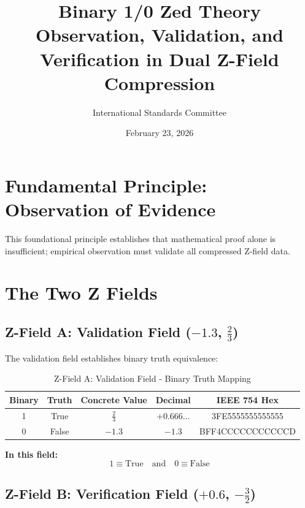 \documentclass[12pt]{article}
\title{Binary 1/0 Zed Theory\\Observation, Validation, and Verification in Dual Z-Field Compression}
\author{International Standards Committee}
\date{February 23, 2026}
\begin{document}
\maketitle

\section{Fundamental Principle: Observation of Evidence}

\begin{center}
\end{center}

This foundational principle establishes that mathematical proof alone is insufficient; empirical observation must validate all compressed Z-field data.

\section{The Two Z Fields}

\subsection{Z-Field A: Validation Field ($-1.3$, $\frac{2}{3}$)}

The validation field establishes binary truth equivalence:

\begin{table}[h]
\centering
\begin{tabular}{|c|c|c|c|c|}
\hline
\textbf{Binary} & \textbf{Truth} & \textbf{Concrete Value} & \textbf{Decimal} & \textbf{IEEE 754 Hex} \\
\hline
1 & True & $\frac{2}{3}$ & $+0.666\ldots$ & 3FE5555555555555 \\
\hline
0 & False & $-1.3$ & $-1.3$ & BFF4CCCCCCCCCCCD \\
\hline
\end{tabular}
\caption{Z-Field A: Validation Field - Binary Truth Mapping}
\end{table}

\textbf{In this field:}
\begin{equation}
\boxed{1 \equiv \text{True} \quad \text{and} \quad 0 \equiv \text{False}}
\end{equation}

\subsection{Z-Field B: Verification Field ($+0.6$, $-\frac{3}{2}$)}
\end{document}
